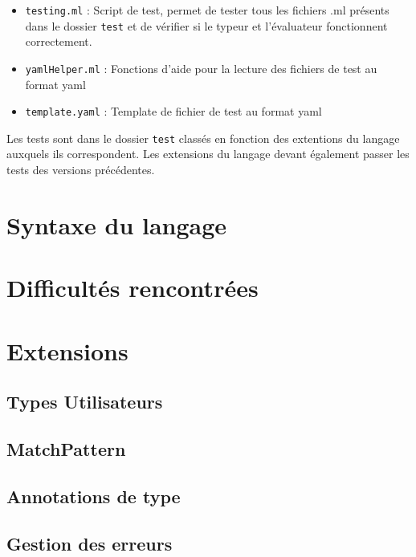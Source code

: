 \documentclass[
  12pt,
]{article}
\providecommand{\tightlist}{%
  \setlength{\itemsep}{0pt}\setlength{\parskip}{0pt}}
\begin{document}
\begin{itemize}
  \begin{itemize}
  \tightlist
  \item
    \texttt{testing.ml} : Script de test, permet de tester tous les
    fichiers .ml présents dans le dossier \texttt{test} et de vérifier
    si le typeur et l'évaluateur fonctionnent correctement.
  \item
    \texttt{yamlHelper.ml} : Fonctions d'aide pour la lecture des
    fichiers de test au format yaml
  \item
    \texttt{template.yaml} : Template de fichier de test au format yaml
  \end{itemize}
\end{itemize}

Les tests sont dans le dossier \texttt{test} classés en fonction des
extentions du langage auxquels ils correspondent. Les extensions du
langage devant également passer les tests des versions précédentes.

\newpage

\section{Syntaxe du langage}\label{syntaxe-du-langage}

\section{Difficultés rencontrées}\label{difficultuxe9s-rencontruxe9es}

\section{Extensions}\label{extensions}

\subsection{Types Utilisateurs}\label{types-utilisateurs}

\subsection{MatchPattern}\label{matchpattern}

\subsection{Annotations de type}\label{annotations-de-type}

\subsection{Gestion des erreurs}\label{gestion-des-erreurs}
\end{document}
